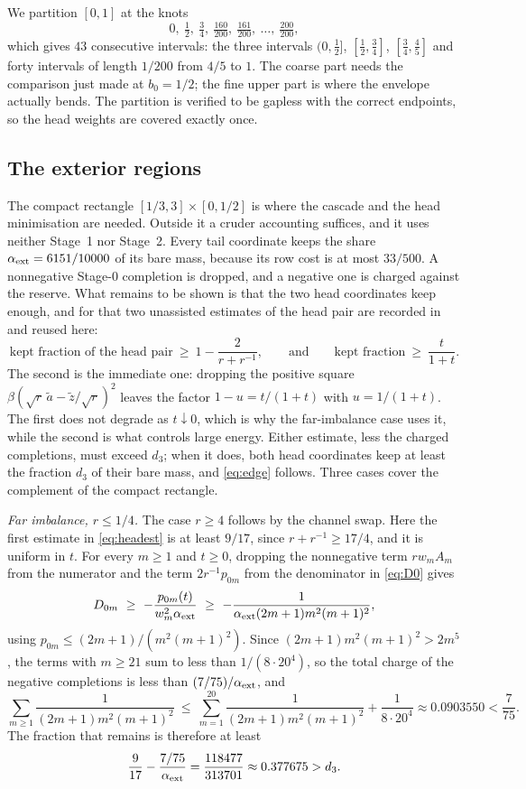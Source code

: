 \documentclass[10pt]{article}
\theoremstyle{remark}
\newcommand{\dthree}{d_{3}}
\begin{document}
We partition $[0,1]$ at the knots
\[
0,\ \tfrac12,\ \tfrac34,\ \tfrac{160}{200},\ \tfrac{161}{200},\ \dots,\ \tfrac{200}{200},
\]
which gives $43$ consecutive intervals: the three intervals $(0,\tfrac12]$, $[\tfrac12,\tfrac34]$, $[\tfrac34,\tfrac45]$ and forty intervals of length $1/200$ from $4/5$ to $1$. The coarse part needs the comparison just made at $b_0=1/2$; the fine upper part is where the envelope actually bends. The partition is verified to be gapless with the correct endpoints, so the head weights are covered exactly once.

\subsection{The exterior regions}

The compact rectangle $[1/3,3]\times[0,1/2]$ is where the cascade and the head minimisation are needed. Outside it a cruder accounting suffices, and it uses neither Stage~1 nor Stage~2. Every tail coordinate keeps the share $\alpha_{\rm ext}=6151/10000$ of its bare mass, because its row cost is at most $33/500$. A nonnegative Stage-0 completion is dropped, and a negative one is charged against the reserve. What remains to be shown is that the two head coordinates keep enough, and for that two unassisted estimates of the head pair are recorded in~\cite{finiteenergy} and reused here:
\begin{equation}\label{eq:headest}
\text{kept fraction of the head pair}\ \ge\ 1-\frac{2}{r+r^{-1}},
\qquad\text{and}\qquad \text{kept fraction}\ \ge\ \frac{t}{1+t}.
\end{equation}
The second is the immediate one: dropping the positive square $\beta(\sqrt r\,\tilde a-\tilde z/\sqrt r)^2$ leaves the factor $1-u=t/(1+t)$ with $u=1/(1+t)$. The first does not degrade as $t\downarrow0$, which is why the far-imbalance case uses it, while the second is what controls large energy. Either estimate, less the charged completions, must exceed $\dthree$; when it does, both head coordinates keep at least the fraction $\dthree$ of their bare mass, and \eqref{eq:edge} follows. Three cases cover the complement of the compact rectangle.

\emph{Far imbalance, $r\le1/4$.} The case $r\ge4$ follows by the channel swap. Here the first estimate in \eqref{eq:headest} is at least $9/17$, since $r+r^{-1}\ge17/4$, and it is uniform in $t$. For every $m\ge1$ and $t\ge0$, dropping the nonnegative term $rw_mA_m$ from the numerator and the term $2r^{-1}p_{0m}$ from the denominator in \eqref{eq:D0} gives
\[
D_{0m}\ \ge\ -\frac{p_{0m}(t)}{w_m^2\alpha_{\rm ext}}\ \ge\ -\frac1{\alpha_{\rm ext}(2m+1)m^2(m+1)^2},
\]
using $p_{0m}\le(2m+1)/(m^2(m+1)^2)$. Since $(2m+1)m^2(m+1)^2>2m^5$, the terms with $m\ge21$ sum to less than $1/(8\cdot20^4)$, so the total charge of the negative completions is less than $(7/75)/\alpha_{\rm ext}$, and
\[
\sum_{m\ge1}\frac1{(2m+1)m^2(m+1)^2}\ \le\ \sum_{m=1}^{20}\frac1{(2m+1)m^2(m+1)^2}+\frac1{8\cdot20^4}\approx0.0903550<\frac7{75}.
\]
The fraction that remains is therefore at least
\[
\frac9{17}-\frac{7/75}{\alpha_{\rm ext}}=\frac{118477}{313701}\approx0.377675>\dthree .
\]
\end{document}
